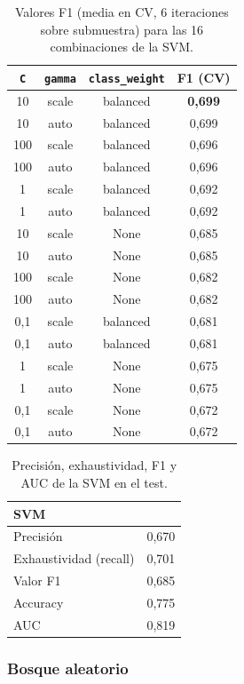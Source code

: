 \documentclass[12pt,a4paper]{report}
\theoremstyle{definition}
\newcommand{\tc}[1]{\texttt{#1}}
\begin{document}
\begin{table}[H]
\centering\footnotesize
\begin{tabular}{cccc}
\toprule
\tc{C} & \tc{gamma} & \tc{class\_weight} & F1 (CV) \\
\midrule
10 & scale & balanced & \textbf{0,699} \\
10 & auto & balanced & 0,699 \\
100 & scale & balanced & 0,696 \\
100 & auto & balanced & 0,696 \\
1 & scale & balanced & 0,692 \\
1 & auto & balanced & 0,692 \\
10 & scale & None & 0,685 \\
10 & auto & None & 0,685 \\
100 & scale & None & 0,682 \\
100 & auto & None & 0,682 \\
0,1 & scale & balanced & 0,681 \\
0,1 & auto & balanced & 0,681 \\
1 & scale & None & 0,675 \\
1 & auto & None & 0,675 \\
0,1 & scale & None & 0,672 \\
0,1 & auto & None & 0,672 \\
\bottomrule
\end{tabular}
\caption{Valores F1 (media en CV, 6 iteraciones sobre submuestra) para las 16 combinaciones de
la SVM.}
\label{tab:grid-svm}
\end{table}

\begin{table}[H]
\centering\small
\begin{tabular}{lc}
\toprule
SVM & \\
\midrule
Precisión & 0,670 \\
Exhaustividad (recall) & 0,701 \\
Valor F1 & 0,685 \\
Accuracy & 0,775 \\
AUC & 0,819 \\
\bottomrule
\end{tabular}
\caption{Precisión, exhaustividad, F1 y AUC de la SVM en el test.}
\label{tab:met-svm}
\end{table}


\subsubsection{Bosque aleatorio}
\end{document}
